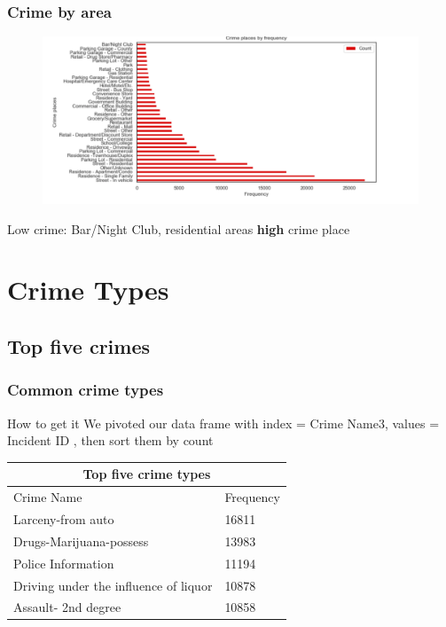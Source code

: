 \documentclass[usenames,dvipsnames]{beamer}
\begin{document}
\begin{frame}
\frametitle{Crime by area}
\graphicspath{{Figures//}}
\vspace{-0.5cm}
\begin{figure}[htbp]
\centering
\includegraphics[width= 4.0 in]{crime_types}
\label{crimetype}
\end{figure}
Low crime: Bar/Night Club, residential areas \textbf{high} crime place
\end{frame}
\section{Crime Types}
\subsection{Top five crimes}
\begin{frame}
\frametitle{Common crime types}
\begin{block}{How to get it}
We pivoted our data frame with index = Crime Name3, values = Incident ID  , then sort them by count 
\end{block}
\begin{tabular}{ |l|l| }
  \hline
  \multicolumn{2}{|c|}{Top five crime types} \\
  \hline
  Crime Name & Frequency \\
  \hline
  Larceny-from auto & 16811 \\
  Drugs-Marijuana-possess & 13983 \\
  Police Information & 11194 \\
  Driving under the influence of liquor & 10878 \\
  Assault- 2nd degree & 10858 \\
  \hline
  \end{tabular}
\end{frame}
\end{document}
